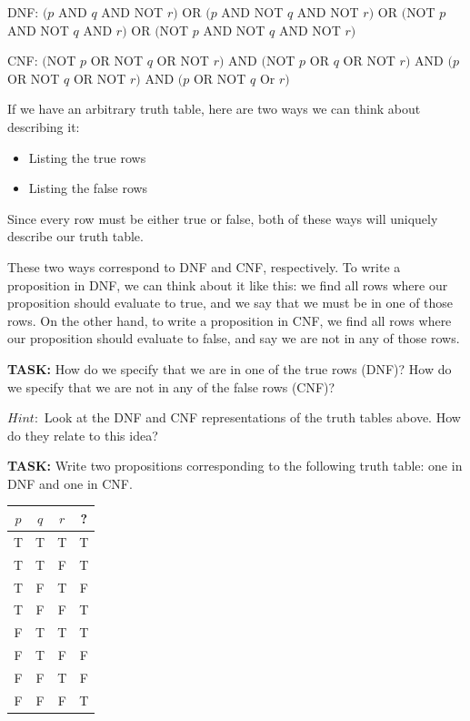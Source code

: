 \documentclass[12pt,letterpaper]{article}
\newif\ifsol
\newcommand{\solu}[2]{ \begin{mdframed} \ifsol #2 \else \vspace{#1} \fi \end{mdframed} }
\begin{document}
    DNF: $(p $ AND $ q $ AND $ $NOT $ r) $ OR $ (p $ AND $ $NOT $ q $ AND $ $NOT $ r) $ OR $ ($NOT $ p $ AND $ $NOT $ q $ AND $ r) $ OR $ ($NOT $ p $ AND $ $NOT $ q $ AND $ $NOT $ r)$
    
	CNF: $($NOT $ p $ OR $ $NOT $ q $ OR $ $NOT $ r) $ AND $ ($NOT $ p $ OR $ q $ OR $ $NOT $ r) $ AND $ (p $ OR $ $NOT $ q $ OR $ $NOT $ r) $ AND $ (p $ OR $ $NOT $ q $ Or $ r)$
	
	If we have an arbitrary truth table, here are two ways we can think about describing it:

	\begin{itemize}
	    \item Listing the true rows
	    \item Listing the false rows
	\end{itemize}
	Since every row must be either true or false, both of these ways will uniquely describe our truth table.
	
	These two ways correspond to DNF and CNF, respectively. To write a proposition in DNF, we can think about it like this: we find all rows where our proposition should evaluate to true, and we say that we must be in one of those rows. On the other hand, to write a proposition in CNF, we find all rows where our proposition should evaluate to false, and say we are not in any of those rows.
	
	\textbf{TASK:} How do we specify that we are in one of the true rows (DNF)? How do we specify that we are not in any of the false rows (CNF)?
	
	$\textit{Hint}:$ Look at the DNF and CNF representations of the truth tables above. How do they relate to this idea?
	
	\solu{4 cm}{For DNF, we AND the true variables and negations of the false variables (to be in the row, the inputs must exactly correspond to the row). For CNF, we OR the false variables and the negations of the true variables (to not be in the row, we just need at least one variable to be different)}
	
	\textbf{TASK:} Write two propositions corresponding to the following truth table: one in DNF and one in CNF.
	
	\begin{tabular}{c|c|c|c}
         $p$ & $q$ & $r$ & ?\\
        \hline
        T & T & T & T \\
        T & T & F & T \\
        T & F & T & F \\
        T & F & F & T \\
        F & T & T & T \\
        F & T & F & F \\
        F & F & T & F \\
        F & F & F & T
    \end{tabular}
	
\end{document}
